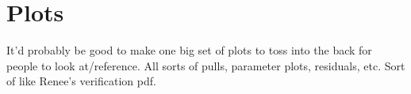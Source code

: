 \section{Plots}

It'd probably be good to make one big set of plots to toss into the back for people to look at/reference. All sorts of pulls, parameter plots, residuals, etc. Sort of like Renee's verification pdf.
